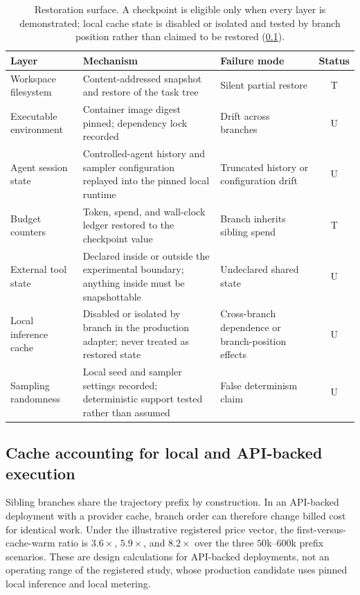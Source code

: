 \begin{table}[ht]
\centering\small
\begin{tabular}{@{}p{3.3cm}p{6.3cm}p{2.1cm}c@{}}
\toprule
Layer & Mechanism & Failure mode & Status \\
\midrule
Workspace filesystem & Content-addressed snapshot and restore of the task tree & Silent partial restore & T \\
Executable environment & Container image digest pinned; dependency lock recorded & Drift across branches & U \\
Agent session state & Controlled-agent history and sampler configuration replayed into the pinned local runtime & Truncated history or configuration drift & U \\
Budget counters & Token, spend, and wall-clock ledger restored to the checkpoint value & Branch inherits sibling spend & T \\
External tool state & Declared inside or outside the experimental boundary; anything inside must be snapshottable & Undeclared shared state & U \\
Local inference cache & Disabled or isolated by branch in the production adapter; never treated as restored state & Cross-branch dependence or branch-position effects & U \\
Sampling randomness & Local seed and sampler settings recorded; deterministic support tested rather than assumed & False determinism claim & U \\
\bottomrule
\end{tabular}
\caption{Restoration surface.  A checkpoint is eligible only when every layer is
demonstrated; local cache state is disabled or isolated and tested by branch
position rather than claimed to be restored (\cref{sec:cache}).}
\label{tab:restoration}
\end{table}

\subsection{Cache accounting for local and API-backed execution}
\label{sec:cache}

Sibling branches share the trajectory prefix by construction.  In an API-backed
deployment with a provider cache, branch order can therefore change billed cost
for identical work.  Under the illustrative registered price vector, the
first-versus-cache-warm ratio is $3.6\times$, $5.9\times$, and $8.2\times$ over
the three $50$k--$600$k prefix scenarios.  These are design calculations for
API-backed deployments, not an operating range of the registered study, whose
production candidate uses pinned local inference and local metering.

